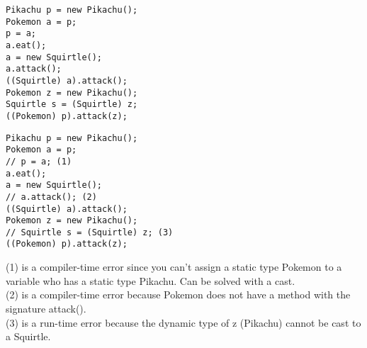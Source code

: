 \ifprintanswers\else
\begin{lstlisting}
Pikachu p = new Pikachu();
Pokemon a = p;
p = a;
a.eat();
a = new Squirtle();
a.attack();
((Squirtle) a).attack();
Pokemon z = new Pikachu();
Squirtle s = (Squirtle) z;
((Pokemon) p).attack(z);
\end{lstlisting}
\fi

\begin{solution}
\begin{lstlisting}
Pikachu p = new Pikachu();
Pokemon a = p;
// p = a; (1)
a.eat();
a = new Squirtle();
// a.attack(); (2)
((Squirtle) a).attack();
Pokemon z = new Pikachu();
// Squirtle s = (Squirtle) z; (3)
((Pokemon) p).attack(z);
\end{lstlisting}
(1) is a compiler-time error since you can't assign a static type Pokemon to
a variable who has a static type Pikachu. Can be solved with a cast.
\\
(2) is a compiler-time error because Pokemon does not have a method with the signature attack().
\\
(3) is a run-time error because the dynamic type of z (Pikachu) cannot be cast
to a Squirtle.
\end{solution}
